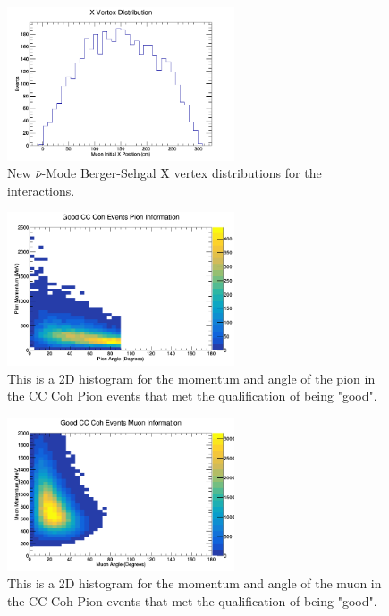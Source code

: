 \documentclass[11pt]{article}
\begin{document}
\begin{figure}[H]
\centering
\includegraphics[width=0.6\textwidth]{NewANMBergerSehgalImages/4-XVertexDistributionANMBS.png}
\caption{New $\bar{\nu}$-Mode Berger-Sehgal X vertex distributions for the interactions.}
\end{figure}

\begin{figure}[H]
\centering
\includegraphics[width=0.6\textwidth]{NewANMBergerSehgalImages/5-GoodCCCohPionInfoANMBS.png}
\caption{This is a 2D histogram for the momentum and angle of the pion in the CC Coh Pion events that met the qualification of being "good".}
\end{figure}

\begin{figure}[H]
\centering
\includegraphics[width=0.6\textwidth]{NewANMBergerSehgalImages/6-GoodCCCohMuonInfoANMBS.png}
\caption{This is a 2D histogram for the momentum and angle of the muon in the CC Coh Pion events that met the qualification of being "good".}
\end{figure}
\end{document}

